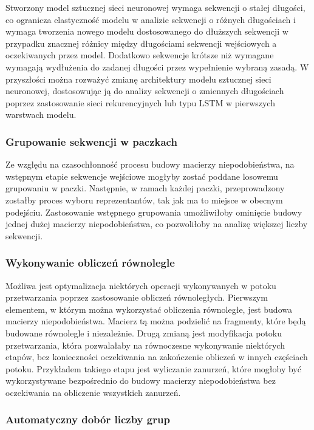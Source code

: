             Stworzony model sztucznej sieci neuronowej wymaga sekwencji o stałej długości, co ogranicza elastyczność modelu w analizie sekwencji o różnych długościach i wymaga tworzenia nowego modelu dostosowanego do dłuższych sekwencji w przypadku znacznej różnicy między długościami sekwencji wejściowych a oczekiwanych przez model. Dodatkowo sekwencje krótsze niż wymagane wymagają wydłużenia do zadanej długości przez wypełnienie wybraną zasadą. W przyszłości można rozważyć zmianę architektury modelu sztucznej sieci neuronowej, dostosowując ją do analizy sekwencji o zmiennych długościach poprzez zastosowanie sieci rekurencyjnych lub typu LSTM w pierwszych warstwach modelu.

        \subsubsection{Grupowanie sekwencji w paczkach}

            Ze względu na czasochłonność procesu budowy macierzy niepodobieństwa, na wstępnym etapie sekwencje wejściowe mogłyby zostać poddane losowemu grupowaniu w paczki. Następnie, w ramach każdej paczki, przeprowadzony zostałby proces wyboru reprezentantów, tak jak ma to miejsce w obecnym podejściu. Zastosowanie wstępnego grupowania umożliwiłoby ominięcie budowy jednej dużej macierzy niepodobieństwa, co pozwoliłoby na analizę większej liczby sekwencji.

        \subsubsection{Wykonywanie obliczeń równolegle}

            Możliwa jest optymalizacja niektórych operacji wykonywanych w potoku przetwarzania poprzez zastosowanie obliczeń równoległych. Pierwszym elementem, w którym można wykorzystać obliczenia równoległe, jest budowa macierzy niepodobieństwa. Macierz tą można podzielić na fragmenty, które będą budowane równolegle i niezależnie. Drugą zmianą jest modyfikacja potoku przetwarzania, która pozwalałaby na równoczesne wykonywanie niektórych etapów, bez konieczności oczekiwania na zakończenie obliczeń w innych częściach potoku. Przykładem takiego etapu jest wyliczanie zanurzeń, które mogłoby być wykorzystywane bezpośrednio do budowy macierzy niepodobieństwa bez oczekiwania na obliczenie wszystkich zanurzeń.

        \subsubsection{Automatyczny dobór liczby grup}

